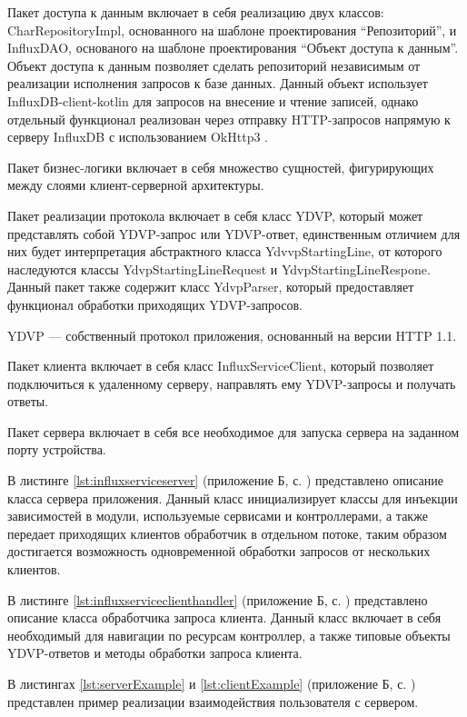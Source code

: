 Пакет доступа к данным включает в себя реализацию двух классов: \newline CharRepositoryImpl, основанного на шаблоне проектирования ``Репозиторий'', и InfluxDAO, основаного на шаблоне проектирования ``Объект доступа к данным''. Объект доступа к данным позволяет сделать репозиторий независимым от реализации исполнения запросов к базе данных. Данный объект использует InfluxDB-client-kotlin \cite{influxClientKotlin} для запросов на внесение и чтение записей, однако отдельный функционал реализован через отправку HTTP-запросов напрямую к серверу InfluxDB с использованием OkHttp3 \cite{OkHttp}.

Пакет бизнес-логики включает в себя множество сущностей, фигурирующих между слоями клиент-серверной архитектуры.

Пакет реализации протокола включает в себя класс YDVP, который может представлять собой YDVP-запрос или YDVP-ответ, единственным отличием для них будет интерпретация абстрактного класса YdvvpStartingLine, от которого наследуются классы YdvpStartingLineRequest и YdvpStartingLineRespone. Данный пакет также содержит класс YdvpParser, который предоставляет функционал обработки приходящих YDVP-запросов.

YDVP --- собственный протокол приложения, основанный на версии \newline HTTP 1.1.

Пакет клиента включает в себя класс InfluxServiceClient, который позволяет подключиться к удаленному серверу, направлять ему YDVP-запросы и получать ответы.

Пакет сервера включает в себя все необходимое для запуска сервера на заданном порту устройства.

В листинге \ref{lst:influxserviceserver} (приложение Б, с. \pageref{chp:application-b}) представлено описание класса сервера приложения. Данный класс инициализирует классы для инъекции зависимостей в модули, используемые сервисами и контроллерами, а также передает приходящих клиентов обработчик в отдельном потоке, таким образом достигается возможность одновременной обработки запросов от нескольких клиентов.

В листинге \ref{lst:influxserviceclienthandler} (приложение Б, с. \pageref{chp:application-b}) представлено описание класса обработчика запроса клиента. Данный класс включает в себя необходимый для навигации по ресурсам контроллер, а также типовые объекты YDVP-ответов и методы обработки запроса клиента.

В листингах \ref{lst:serverExample} и \ref{lst:clientExample} (приложение Б, с. \pageref{chp:application-b}) представлен пример реализации взаимодействия пользователя с сервером.

